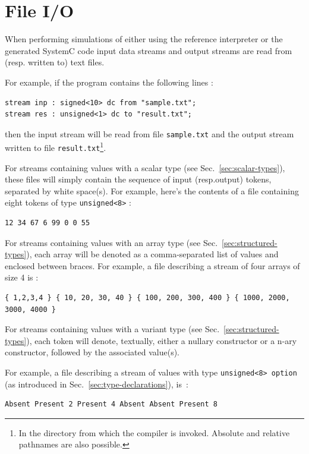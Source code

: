 \section{File I/O}
\label{sec:file-io}

When performing simulations of either using the reference interpreter or the generated SystemC code
input data streams and output streams are read from (resp. written to) text files.

For example, if the program contains the following lines :

\begin{lstlisting}
stream inp : signed<10> dc from "sample.txt";
stream res : unsigned<1> dc to "result.txt";
\end{lstlisting}

then the input stream will be read from file \verb|sample.txt| and the output stream written to file
\verb|result.txt|\footnote{In the directory from which the \caph compiler is invoked. Absolute and
  relative pathnames are also possible. }. 

\medskip
For streams containing values with a scalar type (see Sec.~\ref{sec:scalar-types}), these files will
simply contain the sequence of input (resp.output) tokens, separated by white space(s). For example,
here's the contents of a file containing eight tokens of type \verb|unsigned<8>| :

\begin{verbatim}
12 34 67 6 99 0 0 55
\end{verbatim}

\medskip
For streams containing values with an array type (see Sec.~\ref{sec:structured-types}), each array
will be denoted as a comma-separated list of values and enclosed between braces. For example, a file
describing a stream of four arrays of size 4 is :

\begin{verbatim}
{ 1,2,3,4 } { 10, 20, 30, 40 } { 100, 200, 300, 400 } { 1000, 2000, 3000, 4000 }
\end{verbatim}

\medskip
For streams containing values with a variant type (see Sec.~\ref{sec:structured-types}), each token
will denote, textually, either a nullary constructor or a n-ary constructor, followed by the
associated value(s).

For example, a file describing a stream of values with type \verb|unsigned<8> option| (as introduced in
Sec.~\ref{sec:type-declarations}), is~:

\begin{verbatim}
Absent Present 2 Present 4 Absent Absent Present 8
\end{verbatim}

